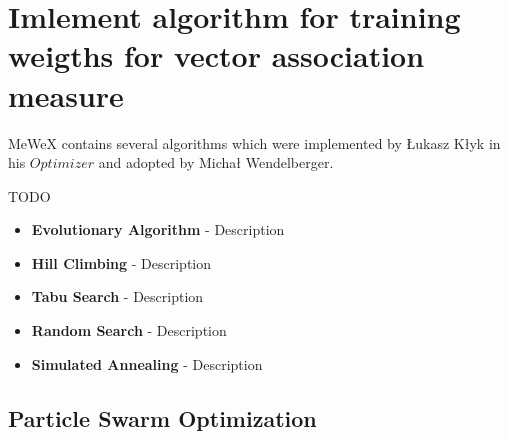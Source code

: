 \chapter{Imlement algorithm for training weigths for vector association measure}

MeWeX contains several algorithms which were implemented by Łukasz Kłyk in his \(Optimizer\) and adopted by 
Michał Wendelberger.

TODO




\begin{itemize}
    \item \textbf{Evolutionary Algorithm} - Description
 
    \item \textbf{Hill Climbing} - Description
 
    \item \textbf{Tabu Search} - Description
 
    \item \textbf{Random Search} - Description
 
    \item \textbf{Simulated Annealing} - Description 
\end{itemize}

\section{Particle Swarm Optimization}\label{pso_def}

